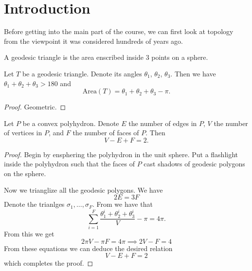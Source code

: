 \documentclass[11pt,a4paper]{article}
\begin{document}
\maketitle


\newpage
\tableofcontents
\newpage

\section{Introduction}

Before getting into the main part of the course, we can first look
at topology from the viewpoint it was considered hundreds of years ago.

\begin{definition}
  A geodesic triangle is the area enscribed inside $3$ points
  on a sphere.
\end{definition}

\begin{theorem}
  \label{thm:girard}
  Let $T$ be a geodesic triangle.
  Denote its angles $\theta_1$, $\theta_2$, $\theta_3$.
  Then we have $\theta_1 + \theta_2 + \theta_3 > 180$ and
  \[
    \mathrm{Area}(T) = \theta_1 + \theta_2 + \theta_3 - \pi.
  \]
\end{theorem}
\begin{proof}
  Geometric.
\end{proof}

\begin{theorem}
  Let $P$ be a convex polyhydron.
  Denote $E$ the number of edges in $P$, $V$ the number of vertices in $P$,
  and $F$ the number of faces of $P$.
  Then
  \[
    V - E + F = 2.
  \]
\end{theorem}
\begin{proof}
  Begin by ensphering the polyhydron in the unit sphere.
  Put a flashlight inside the polyhydron such that the faces of $P$
  cast shadows of geodesic polygons on the sphere.
  
  Now we trianglize all the geodesic polygons.
  We have
  \[
    \boxed{2 E = 3 F}
  \]
  Denote the trianlges $\sigma_1,\dots,\sigma_F$.
  From  we have that
  \[
    \sum_{i=1}^{F} \frac{\theta_1^i + \theta_2^i + \theta_3^i}{V} - \pi =
    4 \pi.
  \]
  From this we get
  \[
    2 \pi V - \pi F = 4 \pi \implies
    \boxed{2 V - F = 4}
  \]
  From these equations we can deduce the desired relation
  \[
    \boxed{V - E + F = 2}
  \]
  which completes the proof.
\end{proof}
\end{document}
